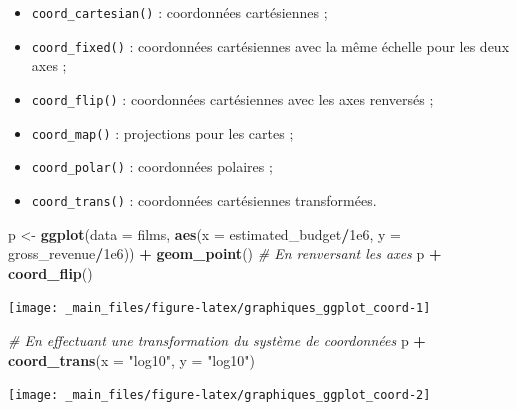 \documentclass[
  11pt,
]{book}
\newenvironment{Shaded}{\begin{snugshade}}{\end{snugshade}}
\newcommand{\CommentTok}[1]{\textcolor[rgb]{0.56,0.35,0.01}{\textit{#1}}}
\newcommand{\DataTypeTok}[1]{\textcolor[rgb]{0.13,0.29,0.53}{#1}}
\newcommand{\FloatTok}[1]{\textcolor[rgb]{0.00,0.00,0.81}{#1}}
\newcommand{\KeywordTok}[1]{\textcolor[rgb]{0.13,0.29,0.53}{\textbf{#1}}}
\newcommand{\NormalTok}[1]{#1}
\newcommand{\OperatorTok}[1]{\textcolor[rgb]{0.81,0.36,0.00}{\textbf{#1}}}
\newcommand{\StringTok}[1]{\textcolor[rgb]{0.31,0.60,0.02}{#1}}
\providecommand{\tightlist}{%
  \setlength{\itemsep}{0pt}\setlength{\parskip}{0pt}}
\numberwithin{equation}{section}
\numberwithin{countremarque}{section}
\begin{document}
\begin{itemize}
\tightlist
\item
  \texttt{coord\_cartesian()} : coordonnées cartésiennes ;
\item
  \texttt{coord\_fixed()} : coordonnées cartésiennes avec la même échelle pour les deux axes ;
\item
  \texttt{coord\_flip()} : coordonnées cartésiennes avec les axes renversés ;
\item
  \texttt{coord\_map()} : projections pour les cartes ;
\item
  \texttt{coord\_polar()} : coordonnées polaires ;
\item
  \texttt{coord\_trans()} : coordonnées cartésiennes transformées.
\end{itemize}

\begin{Shaded}
\begin{Highlighting}[]
\NormalTok{p \textless{}{-}}\StringTok{ }\KeywordTok{ggplot}\NormalTok{(}\DataTypeTok{data =}\NormalTok{ films,}
            \KeywordTok{aes}\NormalTok{(}\DataTypeTok{x =}\NormalTok{ estimated\_budget}\OperatorTok{/}\FloatTok{1e6}\NormalTok{,}
                \DataTypeTok{y =}\NormalTok{ gross\_revenue}\OperatorTok{/}\FloatTok{1e6}\NormalTok{)) }\OperatorTok{+}
\StringTok{  }\KeywordTok{geom\_point}\NormalTok{()}
\CommentTok{\# En renversant les axes}
\NormalTok{p }\OperatorTok{+}\StringTok{ }\KeywordTok{coord\_flip}\NormalTok{()}
\end{Highlighting}
\end{Shaded}

\begin{center}\texttt{[image: \_main\_files/figure-latex/graphiques\_ggplot\_coord-1]} \end{center}

\begin{Shaded}
\begin{Highlighting}[]
\CommentTok{\# En effectuant une transformation du système de coordonnées}
\NormalTok{p }\OperatorTok{+}\StringTok{ }\KeywordTok{coord\_trans}\NormalTok{(}\DataTypeTok{x =} \StringTok{"log10"}\NormalTok{, }\DataTypeTok{y =} \StringTok{"log10"}\NormalTok{)}
\end{Highlighting}
\end{Shaded}

\begin{center}\texttt{[image: \_main\_files/figure-latex/graphiques\_ggplot\_coord-2]} \end{center}
\end{document}
